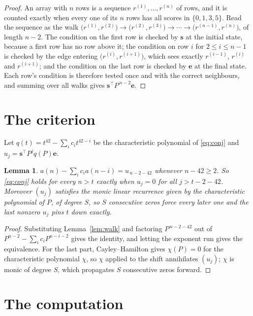 \documentclass[11pt,a4paper]{article}
\theoremstyle{plain}
\newtheorem{lemma}[theorem]{Lemma}
\theoremstyle{definition}
\begin{document}
\begin{proof}
An array with $n$ rows is a sequence $r^{(1)},\dots,r^{(n)}$ of rows, and it is counted
exactly when every one of its $n$ rows has all scores in $\{0,1,3,5\}$. Read the sequence as the
walk $\bigl(r^{(1)},r^{(2)}\bigr)\to\bigl(r^{(2)},r^{(3)}\bigr)\to\cdots\to
\bigl(r^{(n-1)},r^{(n)}\bigr)$, of length $n-2$. The condition on the first row is
checked by $\mathbf{s}$ at the initial state, because a first row has no row above it; the
condition on row $i$ for $2\le i\le n-1$ is checked by the edge entering
$\bigl(r^{(i)},r^{(i+1)}\bigr)$, which sees exactly $r^{(i-1)}$, $r^{(i)}$ and
$r^{(i+1)}$; and the condition on the last row is checked by $\mathbf{e}$ at the final
state. Each row's condition is therefore tested once and with the correct neighbours, and
summing over all walks gives $\mathbf{s}^{\!\top}P^{\,n-2}\mathbf{e}$.
\end{proof}

\section{The criterion}

Let $q(t)=t^{42}-\sum_i c_i t^{42-i}$ be the characteristic polynomial of
\eqref{eq:conj} and $u_j=\mathbf{s}^{\!\top}P^{j}q(P)\mathbf{e}$.

\begin{lemma}\label{lem:crit}
$a(n)-\sum_i c_i a(n-i)=u_{\,n-2-42}$ whenever $n-42\ge2$. So \eqref{eq:conj}
holds for every $n>t$ exactly when $u_j=0$ for all $j>t-2-42$. Moreover $(u_j)$
satisfies the monic linear recurrence given by the characteristic polynomial of $P$, of
degree $S$, so $S$ consecutive zeros force every later one and the last nonzero $u_j$ pins
$t$ down exactly.
\end{lemma}

\begin{proof}
Substituting Lemma~\ref{lem:walk} and factoring $P^{\,n-2-42}$ out of
$P^{n-2}-\sum_i c_i P^{n-i-2}$ gives the identity, and letting the exponent run gives the
equivalence. For the last part, Cayley--Hamilton gives $\chi(P)=0$ for the characteristic
polynomial $\chi$, so $\chi$ applied to the shift annihilates $(u_j)$; $\chi$ is monic of
degree $S$, which propagates $S$ consecutive zeros forward.
\end{proof}

\section{The computation}
\end{document}
